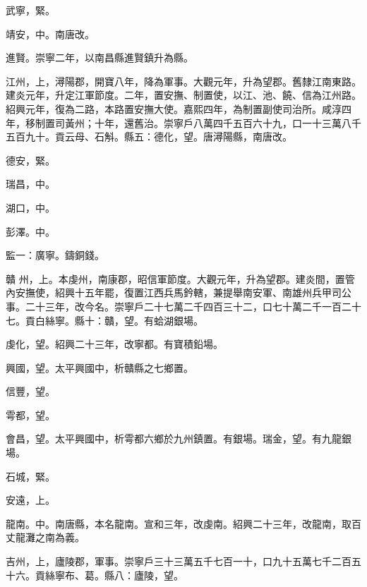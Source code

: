 \begin{pinyinscope}
 武寧，緊。



 靖安，中。南唐改。



 進賢。崇寧二年，以南昌縣進賢鎮升為縣。



 江州，上，潯陽郡，開寶八年，降為軍事。大觀元年，升為望郡。舊隸江南東路。建炎元年，升定江軍節度。二年，置安撫、制置使，以江、池、饒、信為江州路。紹興元年，復為二路，本路置安撫大使。嘉熙四年，為制置副使司治所。咸淳四年，移制置司黃州；十年，還舊治。崇寧戶八萬四千五百六十九，口一十三萬八千五百九十。貢云母、石斛。縣五：德化，望。唐潯陽縣，南唐改。



 德安，緊。



 瑞昌，中。



 湖口，中。



 彭澤。中。



 監一：廣寧。鑄銅錢。



 贛
 州，上。本虔州，南康郡，昭信軍節度。大觀元年，升為望郡。建炎間，置管內安撫使，紹興十五年罷，復置江西兵馬鈐轄，兼提舉南安軍、南雄州兵甲司公事。二十三年，改今名。崇寧戶二十七萬二千四百三十二，口七十萬二千一百二十七。貢白絲寧。縣十：贛，望。有蛤湖銀場。



 虔化，望。紹興二十三年，改寧都。有寶積鉛場。



 興國，望。太平興國中，析贛縣之七鄉置。



 信豐，望。



 雩都，望。



 會昌，望。太平興國中，析雩都六鄉於九州鎮置。有銀場。瑞金，望。有九龍銀場。



 石城，緊。



 安遠，上。



 龍南。中。南唐縣，本名龍南。宣和三年，改虔南。紹興二十三年，改龍南，取百丈龍灘之南為義。



 吉州，上，廬陵郡，軍事。崇寧戶三十三萬五千七百一十，口九十五萬七千二百五十六。貢絲寧布、葛。縣八：廬陵，望。




\end{pinyinscope}
